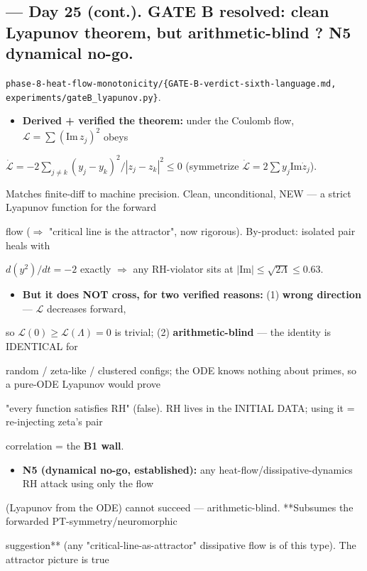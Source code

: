 \documentclass[10pt]{article}
\begin{document}
\subsection*{ --- Day 25 (cont.). GATE B resolved: clean Lyapunov theorem, but arithmetic-blind ? N5 dynamical no-go.}
\texttt{phase-8-heat-flow-monotonicity/\{GATE-B-verdict-sixth-language.md, experiments/gateB\_lyapunov.py\}}.\par
\begin{itemize}
\item \textbf{Derived + verified the theorem:} under the Coulomb flow, $\mathcal L=\sum(\mathrm{Im}\,z_j)^2$ obeys
\end{itemize}
  $\dot{\mathcal L}=-2\sum_{j\ne k}(y_j-y_k)^2/|z_j-z_k|^2\le0$ (symmetrize $\dot{\mathcal L}=2\sum y_j\mathrm{Im}\dot z_j$).\par
  Matches finite-diff to machine precision. Clean, unconditional, NEW --- a strict Lyapunov function for the forward\par
  flow ($\Rightarrow$ "critical line is the attractor", now rigorous). By-product: isolated pair heals with\par
  $d(y^2)/dt=-2$ exactly $\Rightarrow$ any RH-violator sits at $|\mathrm{Im}|\le\sqrt{2\Lambda}\le0.63$.\par
\begin{itemize}
\item \textbf{But it does NOT cross, for two verified reasons:} (1) \textbf{wrong direction} --- $\mathcal L$ decreases forward,
\end{itemize}
  so $\mathcal L(0)\ge\mathcal L(\Lambda)=0$ is trivial; (2) \textbf{arithmetic-blind} --- the identity is IDENTICAL for\par
  random / zeta-like / clustered configs; the ODE knows nothing about primes, so a pure-ODE Lyapunov would prove\par
  "every function satisfies RH" (false). RH lives in the INITIAL DATA; using it = re-injecting zeta's pair\par
  correlation = the \textbf{B1 wall}.\par
\begin{itemize}
\item \textbf{N5 (dynamical no-go, established):} any heat-flow/dissipative-dynamics RH attack using only the flow
\end{itemize}
  (Lyapunov from the ODE) cannot succeed --- arithmetic-blind. **Subsumes the forwarded PT-symmetry/neuromorphic\par
  suggestion** (any "critical-line-as-attractor" dissipative flow is of this type). The attractor picture is true\par
\end{document}
